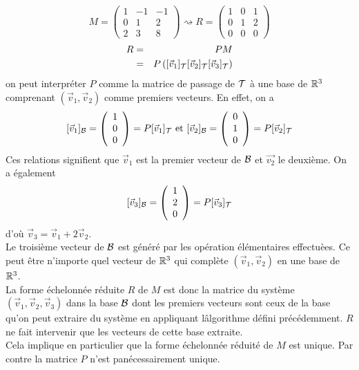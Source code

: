 $$M = \begin{pmatrix} 
  1 & -1 & -1 \\
  0 & 1 & 2  \\
  2 & 3 & 8
\end{pmatrix}
\rightsquigarrow  
R = \begin{pmatrix}
  1 & 0 & 1 \\
  0 & 1 & 2 \\
  0 & 0 & 0
\end{pmatrix}$$
\begin{eqnarray*}
  R &=& P M \\
    &=& P \left([\vec{v}_1]_{\mathcal{T}} [\vec{v}_2]_{\mathcal{T}} [\vec{v}_3]_{\mathcal{T}}\right)
\end{eqnarray*}
on peut interpréter $P$ comme la matrice de passage de $\mathcal{T}$ à une base de $\mathbb{R}^3$ comprenant $(\vec{v}_1, \vec{v}_2)$ comme premiers vecteurs. En effet, on a
$$[\vec{v}_1]_{\mathcal{B}} = \left( \begin{array}{c} 1 \\ 0 \\ 0 \end{array} \right) = P[\vec{v}_1]_{\mathcal{T}} \text{ et } 
  [\vec{v}_2]_{\mathcal{B}} = \left( \begin{array}{c} 0 \\ 1 \\ 0 \end{array} \right) = P[\vec{v}_2]_{\mathcal{T}}$$
Ces relations signifient que $\vec{v}_1$ est la premier vecteur de $\mathcal{B}$ et $\vec{v_2}$ le deuxième. On a également
$$[\vec{v}_3]_{\mathcal{B}} = \left( \begin{array}{c} 1 \\ 2 \\ 0 \end{array}\right) = P [\vec{v}_3]_{\mathcal{T}}$$
d'où $\vec{v}_3 = \vec{v}_1 + 2 \vec{v}_2$. \\
Le troisième vecteur de $\mathcal{B}$ est généré par les opération élémentaires effectuèes. Ce peut être n'importe quel vecteur de $\mathbb{R}^3$ qui complète $(\vec{v}_1, \vec{v}_2)$ en une base de $\mathbb{R}^3$. \\
La forme échelonnée réduite $R$ de $M$ est donc la matrice du système $(\vec{v}_1, \vec{v}_2, \vec{v}_3)$ dans la base $\mathcal{B}$ dont les premiers vecteurs sont ceux de la base qu'on peut extraire du système en appliquant lâlgorithme défini précédemment. $R$ ne fait intervenir que les vecteurs de cette base extraite. \\
Cela implique en particulier que la forme échelonnée réduité de $M$ est unique. Par contre la matrice $P$ n'est panécessairement unique.


